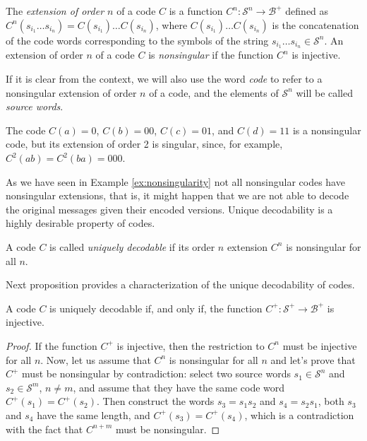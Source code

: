 \begin{definition}
The \emph{extension of order $n$} of a code $C$ is a function $C^{n}:\mathcal{S}^{n}\rightarrow\mathcal{B}^{+}$ defined as $C^{n}(s_{i_1} \ldots s_{i_n}) = C(s_{i_1}) \ldots C(s_{i_n})$, where $C(s_{i_1}) \ldots C(s_{i_n})$ is the concatenation of the code words corresponding to the symbols of the string $s_{i_1} \ldots s_{i_n} \in \mathcal{S}^{n}$. An extension of order $n$ of a code $C$ is \emph{nonsingular} if the function $C^{n}$ is injective.
\end{definition}

If it is clear from the context, we will also use the word \emph{code} to refer to a nonsingular extension of order $n$ of a code, and the elements of \(\mathcal{S}^{n}\) will be called \emph{source words}.

\begin{example}
\label{ex:nonsingularity}
The code $C(a)=0$, $C(b)=00$, $C(c)=01$, and $C(d)=11$ is a nonsingular code, but its extension of order 2 is singular, since, for example, $C^2(ab)=C^2(ba)=000$.
\end{example}

As we have seen in Example \ref{ex:nonsingularity} not all nonsingular codes have nonsingular extensions, that is, it might happen that we are not able to decode the original messages given their encoded versions. Unique decodability is a highly desirable property of codes.

\begin{definition}
A code $C$ is called \emph{uniquely decodable} if its order $n$ extension $C^{n}$ is nonsingular for all $n$.
\end{definition}

Next proposition provides a characterization of the unique decodability of codes.

\begin{proposition}
A code $C$ is uniquely decodable if, and only if, the function $C^{+}:\mathcal{S}^{+}\rightarrow\mathcal{B}^{+}$ is injective.
\end{proposition}
\begin{proof}
If the function $C^{+}$ is injective, then the restriction to $C^{n}$ must be injective for all $n$. Now, let us assume that $C^{n}$ is nonsingular for all $n$ and let's prove that $C^{+}$ must be nonsingular by contradiction: select two source words $s_{1} \in \mathcal{S}^{n}$ and $s_{2} \in \mathcal{S}^{m}$, $n \neq m$, and assume that they have the same code word $C^{+}(s_{1}) = C^{+}(s_{2})$. Then construct the words $s_{3} = s_{1}s_{2}$ and $s_{4} = s_{2}s_{1}$, both $s_{3}$ and $s_{4}$ have the same length, and $C^{+}(s_{3}) = C^{+}(s_{4})$, which is a contradiction with the fact that $C^{n+m}$ must be nonsingular.
\end{proof}

